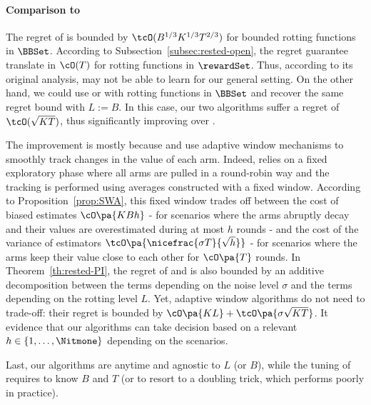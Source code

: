 \paragraph{Comparison to \citet{levine2017rotting}} The regret of \SWA is bounded by $\tcO(B^{1/3}K^{1/3} T^{2/3})$ for bounded rotting functions in $\BBSet$. According to Subsection~\ref{subsec:rested-open}, the regret guarantee translate in $\cO(T)$ for rotting functions in $\rewardSet$.  Thus, according to its original analysis, \SWA may not be able to learn for our general setting. On the other hand, we could use \FEWA or \RUCB with rotting functions in $\BBSet$ and recover the same regret bound with $L := B$. In this case, our two algorithms suffer a regret of $\tcO(\sqrt{KT})$, thus significantly improving over \SWA. 

The improvement is mostly because \FEWA and \RUCB use adaptive window mechanisms to smoothly track changes in the value of each arm.  Indeed, \SWA relies on a fixed exploratory phase where all arms are pulled in a round-robin way and the tracking is performed using averages constructed with a fixed window. According to Proposition~\ref{prop:SWA}, this fixed window trades off between the cost of biased estimates $\cO\pa{KBh}$ - for scenarios where the arms abruptly decay and their values are overestimated during at most $h$ rounds - and the cost of the variance of estimators $\tcO\pa{{\nicefrac{\sigma T}{\sqrt{h}}}}$ - for scenarios where the arms keep their value close to each other for $\cO\pa{T}$ rounds. In Theorem~\ref{th:rested-PI}, the regret of \FEWA and \RUCB is also bounded by an additive decomposition between the terms depending on the noise level $\sigma$ and the terms depending on the rotting level $L$. Yet, adaptive window algorithms do not need to trade-off: their regret is bounded by $\cO\pa{KL} +\tcO\pa{\sigma\sqrt{KT}}$. It evidence that our algorithms can take decision based on a relevant $h \in \left\{1, \dots, \Nitmone\right\}$ depending on the scenarios.

Last, our algorithms are anytime and agnostic to $L$ (or $B$), while the tuning of \SWA requires to know $B$ and $T$ (or to resort to a doubling trick, which performs poorly in practice). 

